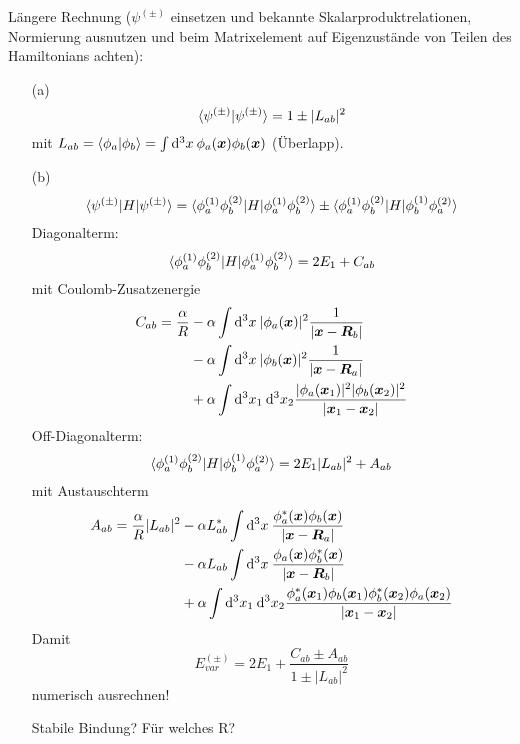\documentclass[11pt,a4paper]{report}
\renewcommand{\vec}{\boldsymbol}
\begin{document}
Längere Rechnung ($\psi^{(\pm )}$ einsetzen und bekannte Skalarproduktrelationen, Normierung ausnutzen und beim Matrixelement auf Eigenzustände von Teilen des Hamiltonians achten):
\begin{itemize}
\item[(a)] $$\langle \psi^{(\pm )} | \psi^{(\pm )} \rangle = 1\pm |L_{ab}|^2$$
mit $L_{ab}=\sprod{\phi_a}{\phi_b}=\int\dif^3x\:\phi_a(\vec{x})\phi_b(\vec{x})$ (Überlapp).
\item[(b)] $$\langle \psi^{(\pm )}|H|\psi^{(\pm )}\rangle = \langle \phi_a^{(1)}\phi_b^{(2)}|H|\phi_a^{(1)}\phi_b^{(2)}\rangle \pm \langle \phi_a^{(1)}\phi_b^{(2)}|H|\phi_b^{(1)}\phi_a^{(2)}\rangle$$
Diagonalterm:
$$\langle \phi_a^{(1)}\phi_b^{(2)}|H|\phi_a^{(1)}\phi_b^{(2)}\rangle=2E_1+C_{ab}$$
mit Coulomb-Zusatzenergie 
\begin{align*}
C_{ab}=\frac{\alpha}{R}&-\alpha\int\dif^3x\: |\phi_a(\vec{x})|^2\frac{1}{|\vec{x}-\vec{R}_b|} \\
&- \alpha\int\dif^3x\: |\phi_b(\vec{x})|^2\frac{1}{|\vec{x}-\vec{R}_a|} \\
&+\alpha\int\dif^3x_1\:\dif^3x_2\frac{|\phi_a(\vec{x}_1)|^2|\phi_b(\vec{x}_2)|^2}{|\vec{x}_1-\vec{x}_2|}
\end{align*}
Off-Diagonalterm:
$$\langle \phi_a^{(1)}\phi_b^{(2)}|H|\phi_b^{(1)}\phi_a^{(2)}\rangle= 2E_1|L_{ab}|^2+A_{ab}$$
mit Austauschterm
\begin{align*}
A_{ab}=\frac{\alpha}{R}|L_{ab}|^2 &-\alpha L_{ab}^*\int\dif^3x\: \frac{\phi^*_a(\vec{x})\phi_b(\vec{x})}{|\vec{x}-\vec{R}_a|} \\
&-\alpha L_{ab}\int\dif^3x\: \frac{\phi_a(\vec{x})\phi_b^*(\vec{x})}{|\vec{x}-\vec{R}_b|} \\
&+\alpha \int\dif^3x_1\:\dif^3x_2\frac{\phi_a^*(\vec{x}_1)\phi_b(\vec{x}_1)\phi_b^*(\vec{x}_2)\phi_a(\vec{x}_2)}{|\vec{x}_1-\vec{x}_2|}
\end{align*}
Damit
$$\boxed{E_{var}^{(\pm )}=2E_1 + \frac{C_{ab}\pm A_{ab}}{1\pm |L_{ab}|^2}}$$
numerisch ausrechnen!\par 
Stabile Bindung? Für welches R?


\end{itemize}
\end{document}
